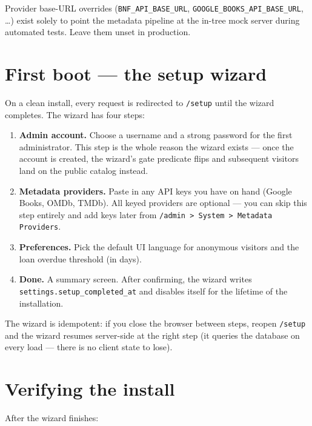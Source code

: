 Provider base-URL overrides (\texttt{BNF\_API\_BASE\_URL},
\texttt{GOOGLE\_BOOKS\_API\_BASE\_URL}, \dots) exist solely to point
the metadata pipeline at the in-tree mock server during automated
tests. Leave them unset in production.

\section{First boot — the setup wizard}\label{sec:first-boot}

On a clean install, every request is redirected to \texttt{/setup}
until the wizard completes. The wizard has four
steps:

\begin{enumerate}
  \item \textbf{Admin account.} Choose a username and a strong
        password for the first administrator. This step is the whole
        reason the wizard exists — once the account is created, the
        wizard's gate predicate flips and subsequent visitors land on
        the public catalog instead.
  \item \textbf{Metadata providers.} Paste in any API keys you have
        on hand (Google Books, OMDb, TMDb). All keyed providers are
        optional — you can skip this step entirely and add keys later
        from \texttt{/admin > System > Metadata Providers}.
  \item \textbf{Preferences.} Pick the default UI language for
        anonymous visitors and the loan overdue threshold (in days).
  \item \textbf{Done.} A summary screen. After confirming, the wizard
        writes \texttt{settings.setup\_completed\_at} and disables
        itself for the lifetime of the installation.
\end{enumerate}

The wizard is idempotent: if you close the browser between steps,
reopen \texttt{/setup} and the wizard resumes server-side at the
right step (it queries the database on every load — there is no
client state to lose).

\section{Verifying the install}

After the wizard finishes:

